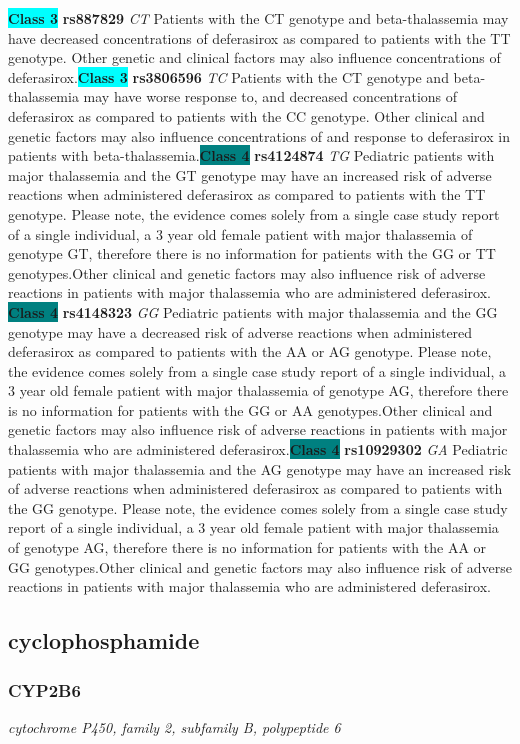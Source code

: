 \documentclass{report}
\begin{document}
\textbf{\colorbox{cyan} {Class 3}} \textbf{ rs887829 } \textit{ CT }
Patients with the CT genotype and beta-thalassemia may have decreased concentrations of deferasirox as compared to patients with the TT genotype. Other genetic and clinical factors may also influence concentrations of deferasirox.\newline\textbf{\colorbox{cyan} {Class 3}} \textbf{ rs3806596 } \textit{ TC }
Patients with the CT genotype and beta-thalassemia may have worse response to, and decreased concentrations of deferasirox as compared to patients with the CC genotype. Other clinical and genetic factors may also influence concentrations of and response to deferasirox in patients with beta-thalassemia.\newline\textbf{\colorbox{teal} {Class 4}} \textbf{ rs4124874 } \textit{ TG }
Pediatric patients with major thalassemia and the GT genotype may have an increased risk of adverse reactions when administered deferasirox as compared to patients with the TT genotype. Please note, the evidence comes solely from a single case study report of a single individual, a 3 year old female patient with major thalassemia of genotype GT, therefore there is no information for patients with the GG or TT genotypes.Other clinical and genetic factors may also influence risk of adverse reactions in patients with major thalassemia who are administered deferasirox. \newline\textbf{\colorbox{teal} {Class 4}} \textbf{ rs4148323 } \textit{ GG }
Pediatric patients with major thalassemia and the GG genotype may have a decreased risk of adverse reactions when administered deferasirox as compared to patients with the AA or AG genotype. Please note, the evidence comes solely from a single case study report of a single individual, a 3 year old female patient with major thalassemia of genotype AG, therefore there is no information for patients with the GG or AA genotypes.Other clinical and genetic factors may also influence risk of adverse reactions in patients with major thalassemia who are administered deferasirox.\newline\textbf{\colorbox{teal} {Class 4}} \textbf{ rs10929302 } \textit{ GA }
Pediatric patients with major thalassemia and the AG genotype may have an increased risk of adverse reactions when administered deferasirox as compared to patients with the GG genotype. Please note, the evidence comes solely from a single case study report of a single individual, a 3 year old female patient with major thalassemia of genotype AG, therefore there is no information for patients with the AA or GG genotypes.Other clinical and genetic factors may also influence risk of adverse reactions in patients with major thalassemia who are administered deferasirox.\newline\subsection{ cyclophosphamide }\subsubsection{ CYP2B6 }
\textit{ cytochrome P450, family 2, subfamily B, polypeptide 6 }
\end{document}
